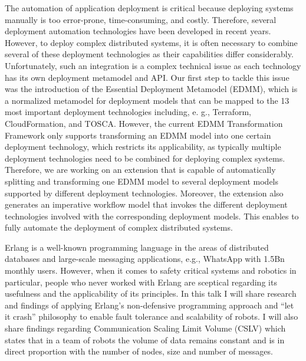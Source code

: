\documentclass[a4paper,UKenglish]{dagrep-v2018}
\begin{document}

\license

The automation of application deployment is critical because deploying systems manually is too error-prone, time-consuming, and costly. Therefore, several deployment automation technologies have been developed in recent years. However, to deploy complex distributed systems, it is often necessary to combine several of these deployment technologies as their capabilities differ considerably. Unfortunately, such an integration is a complex technical issue as each technology has its own deployment metamodel and API. Our first step to tackle this issue was the introduction of the Essential Deployment Metamodel (EDMM), which is a normalized metamodel for deployment models that can be mapped to the 13 most important deployment technologies including, e. g., Terraform, CloudFormation, and TOSCA. However, the current EDMM Transformation Framework only supports transforming an EDMM model into one certain deployment technology, which restricts its applicability, as typically multiple deployment technologies need to be combined for deploying complex systems. Therefore, we are working on an extension that is capable of automatically splitting and transforming one EDMM model to several  deployment models supported by different deployment technologies. Moreover, the extension also generates an imperative workflow model that invokes the different deployment technologies involved with the corresponding deployment models. This enables to fully automate the deployment of complex distributed systems.


\license

Erlang is a well-known programming language in the areas of distributed databases and large-scale messaging applications, e.g., WhatsApp with 1.5Bn monthly users. However, when it comes to safety critical systems and robotics in particular, people who never worked with Erlang are sceptical regarding its usefulness and the applicability of its principles. In this talk I will share research and findings of applying Erlang's non-defensive programming approach and ``let it crash'' philosophy to enable fault tolerance and scalability of robots. I will also share findings regarding Communication Scaling Limit Volume (CSLV) which states that in a team of robots the volume of data remains constant and is in direct proportion with the number of nodes, size and number of messages.
\end{document}
